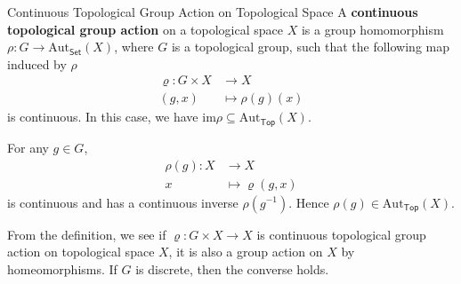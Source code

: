 \documentclass{report}
\begin{document}
\begin{definition}{Continuous Topological Group Action on Topological Space}{}
	A \textbf{continuous topological group action} on a topological space $X$ is a group homomorphism $\rho:G\to \mathrm{Aut}_{\mathsf{Set}}(X)$, where $G$ is a topological group, such that the following map induced by $\rho$
	\begin{align*}
		\varrho:G\times X & \longrightarrow X      \\
		(g,x)             & \longmapsto \rho(g)(x)
	\end{align*}
	is continuous. In this case, we have $\mathrm{im}\rho \subseteq \mathrm{Aut}_{\mathsf{Top}}(X)$.
\end{definition}

\begin{prf}
	For any $g\in G$,
	\begin{align*}
		\rho(g): X & \longrightarrow X        \\
		x          & \longmapsto \varrho(g,x)
	\end{align*}
	is continuous and has a continuous inverse $\rho(g^{-1})$. Hence $\rho(g)\in \mathrm{Aut}_{\mathsf{Top}}(X)$.
\end{prf}

From the definition, we see if $\varrho:G\times X\to X$ is continuous topological group action on topological space $X$, it is also a group action on $X$ by homeomorphisms. If $G$ is discrete, then the converse holds.
\end{document}

